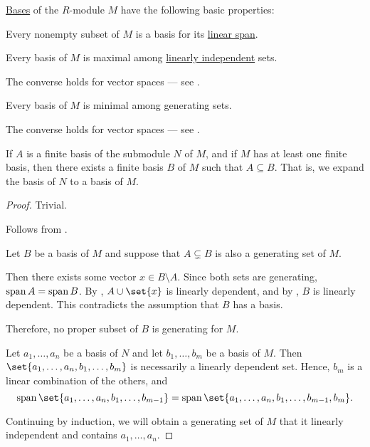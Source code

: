 \begin{proposition}\label{thm:def:hamel_basis}
  \hyperref[def:hamel_basis]{Bases} of the \( R \)-module \( M \) have the following basic properties:
  \begin{thmenum}
     Every nonempty subset of \( M \) is a basis for its \hyperref[def:semimodule/submodel]{linear span}.

     Every basis of \( M \) is maximal among \hyperref[thm:def:linear_dependence]{linearly independent} sets.

    The converse holds for vector spaces --- see .

     Every basis of \( M \) is minimal among generating sets.

    The converse holds for vector spaces --- see .

     If \( A \) is a finite basis of the submodule \( N \) of \( M \), and if \( M \) has at least one finite basis, then there exists a finite basis \( B \) of \( M \) such that \( A \subseteq B \). That is, we expand the basis of \( N \) to a basis of \( M \).
  \end{thmenum}
\end{proposition}
\begin{proof}
   Trivial.

   Follows from .

   Let \( B \) be a basis of \( M \) and suppose that \( A \subsetneq B \) is also a generating set of \( M \).

  Then there exists some vector \( x \in B \setminus A \). Since both sets are generating, \( \operatorname{span} A = \operatorname{span} B \). By , \( A \cup \set{ x } \) is linearly dependent, and by , \( B \) is linearly dependent. This contradicts the assumption that \( B \) has a basis.

  Therefore, no proper subset of \( B \) is generating for \( M \).

   Let \( a_1, \ldots, a_n \) be a basis of \( N \) and let \( b_1, \ldots, b_m \) be a basis of \( M \). Then \( \set{ a_1, \ldots, a_n, b_1, \ldots, b_m } \) is necessarily a linearly dependent set. Hence, \( b_m \) is a linear combination of the others, and
  \begin{equation*}
    \linspan\set{ a_1, \ldots, a_n, b_1, \ldots, b_{m-1} } = \linspan\set{ a_1, \ldots, a_n, b_1, \ldots, b_{m-1}, b_m }.
  \end{equation*}

  Continuing by induction, we will obtain a generating set of \( M \) that it linearly independent and contains \( a_1, \ldots, a_n \).
\end{proof}


